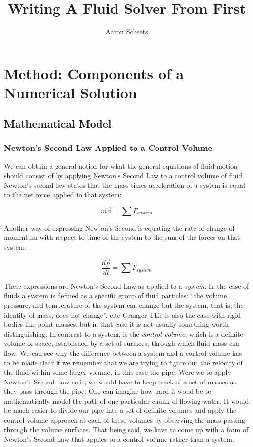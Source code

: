 \documentclass[twocolumn,12pth]{article}
\title{Writing A Fluid Solver From First}
\author{Aaron Scheets}
\begin{document}
\maketitle

\section{Method: Components of a Numerical Solution}

\subsection{Mathematical Model}

\subsubsection{Newton's Second Law Applied to a Control Volume}

We can obtain a general notion for what the general equations of fluid motion should consist of by applying Newton's Second Law to a control volume of fluid.
Newton's second law states that the mass times acceleration of a system is equal to the net force applied to that system:

\begin{equation*}
m\vec{a} = \sum{F_{system}}
\end{equation*}

Another way of expressing Newton's Second is equating the rate of change of momentum with respect to time of the system to the sum of the forces on that system:

\begin{equation}
\frac{d{\vec{p}}}{dt} = \sum F_{system}
\end{equation}

These expressions are Newton's Second Law as applied to a \textit{system}.
In the case of fluids a system is defined as a specific group of fluid particles: ``the volume, pressure, and temperature of the system can change but the system, that is, the identity of mass, does not change''. cite Granger
This is also the case with rigid bodies like point masses, but in that case it is not usually something worth distinguishing.
In contrast to a system, is the \textit{control volume}, which is a definite volume of space, established by a set of surfaces, through which fluid mass can flow.
We can see why the difference between a system and a control volume has to be made clear if we remember that we are trying to figure out the velocity of the fluid within some larger volume, in this case the pipe.
Were we to apply Newton's Second Law as is, we would have to keep track of a set of masses as they pass through the pipe.
One can imagine how hard it woud be to mathematically model the path of one particular chunk of flowing water.
It would be much easier to divide our pipe into a set of definite volumes and apply the control volume approach at each of these volumes by observing the mass passing through the volume surfaces.
That being said, we have to come up with a form of Newton's Second Law that applies to a control volume rather than a system.
\end{document}
